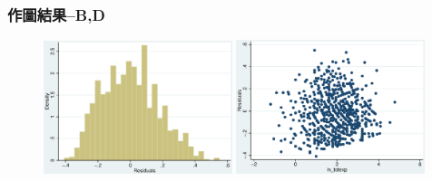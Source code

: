 \begin{frame}
    \frametitle{作圖結果--B,D}
    \begin{figure}
        \includegraphics[width = 0.49\textwidth]{../Results/Q4_11_hist_1.eps}
        \includegraphics[width = 0.49\textwidth]{../Results/Q4_11_scatter_1.eps}
    \end{figure}
\end{frame}

